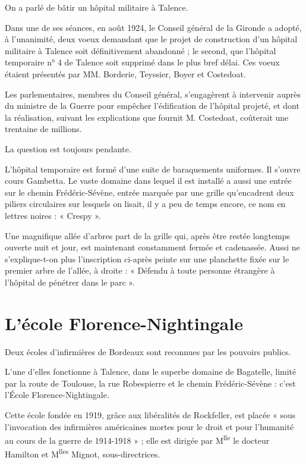 \documentclass[a4paper,11pt]{book}
\begin{document}
On a parlé de bâtir un hôpital militaire à Talence.

Dans une de ses séances, en août 1924, le Conseil général de la Gironde a adopté, à l'unanimité, deux voeux demandant que le projet de construction d'un hôpital militaire à Talence soit définitivement abandonné ; le second, que l'hôpital temporaire n° 4 de Talence soit supprimé dans le plus bref délai. Ces voeux étaient présentés par
MM. Borderie, Teyssier, Boyer et Costedoat.

Les parlementaires, membres du Conseil général, s'engagèrent à intervenir auprès du ministre de la Guerre pour empêcher l'édification de l'hôpital projeté, et dont la réalisation, suivant les explications que fournit M. Costedoat, coûterait une trentaine de millions.

La question est toujours pendante.

L'hôpital temporaire est formé d'une suite de baraquements uniformes. Il s'ouvre cours Gambetta. Le vaste domaine dans lequel il est installé a aussi une entrée sur le chemin Frédéric-Sévène, entrée marquée par une grille qu'encadrent deux piliers circulaires sur lesquels on lisait, il y a peu de temps encore, ce nom en lettres noires :
« Crespy ».

Une magnifique allée d'arbres part de la grille qui, après être restée longtemps ouverte nuit et jour, est maintenant constamment fermée et cadenassée. Aussi ne s'explique-t-on plus l'inscription ci-après peinte sur une planchette fixée sur le premier arbre de l'allée, à droite : « Défendu à toute personne étrangère à l'hôpital de pénétrer dans le parc ».

\section{L'école Florence-Nightingale}

Deux écoles d'infirmières de Bordeaux sont reconnues par les pouvoirs publics.

L'une d'elles fonctionne à Talence, dans le superbe domaine de Bagatelle, limité par la route de Toulouse, la rue Robespierre et le chemin Frédéric-Sévène : c'est l'École Florence-Nightingale.

Cette école fondée en 1919, grâce aux libéralités de Rockfeller, est placée « sous l'invocation des infirmières américaines mortes pour le droit et pour l'humanité au cours de la guerre de 1914-1918 » ; elle est dirigée par M\textsuperscript{lle} le docteur Hamilton et M\textsuperscript{lles} Mignot, sous-directrices.
\end{document}
